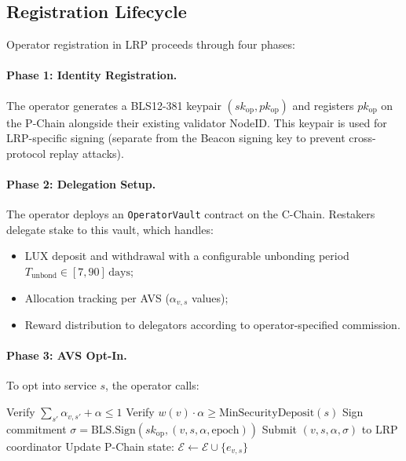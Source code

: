 \documentclass[11pt]{article}
\begin{document}
\subsection{Registration Lifecycle}

Operator registration in LRP proceeds through four phases:

\paragraph{Phase 1: Identity Registration.}
The operator generates a BLS12-381 keypair $(sk_{\text{op}}, pk_{\text{op}})$ and registers
$pk_{\text{op}}$ on the P-Chain alongside their existing validator NodeID. This keypair is
used for LRP-specific signing (separate from the Beacon signing key to prevent cross-protocol
replay attacks).

\paragraph{Phase 2: Delegation Setup.}
The operator deploys an \texttt{OperatorVault} contract on the C-Chain. Restakers delegate
stake to this vault, which handles:
\begin{itemize}
  \item LUX deposit and withdrawal with a configurable unbonding period
    $T_{\text{unbond}} \in [7, 90]\,\text{days}$;
  \item Allocation tracking per AVS ($\alpha_{v,s}$ values);
  \item Reward distribution to delegators according to operator-specified commission.
\end{itemize}

\paragraph{Phase 3: AVS Opt-In.}
To opt into service $s$, the operator calls:

\begin{algorithmic}
  \State Verify $\sum_{s'} \alpha_{v,s'} + \alpha \leq 1$
  \State Verify $w(v) \cdot \alpha \geq \text{MinSecurityDeposit}(s)$
  \State Sign commitment $\sigma = \text{BLS.Sign}(sk_{\text{op}}, (v, s, \alpha, \text{epoch}))$
  \State Submit $(v, s, \alpha, \sigma)$ to LRP coordinator
  \State Update P-Chain state: $\mathcal{E} \leftarrow \mathcal{E} \cup \{e_{v,s}\}$
\EndFunction
\end{algorithmic}
\end{document}
